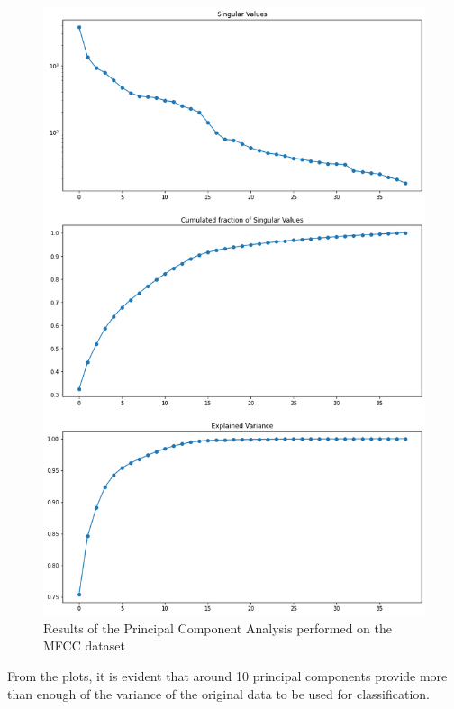 \documentclass[12pt]{article}
\begin{document}
	\begin{figure}[H]
		\hspace{70pt}\includegraphics[scale=0.44]{mfcc_pca}
		\caption{Results of the Principal Component Analysis performed on the MFCC dataset}
	\end{figure}

	From the plots, it is evident that around 10 principal components provide more than enough of the variance of the original data to be used for classification.
	
\end{document}
